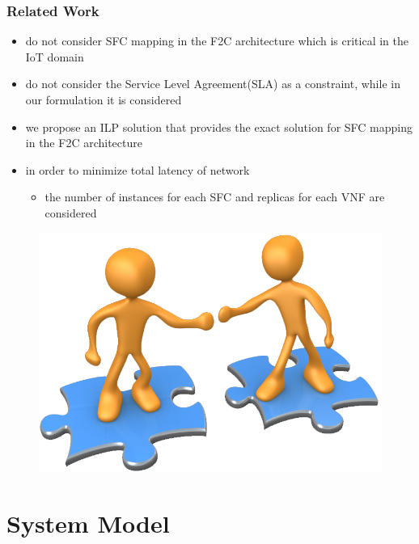 \documentclass{beamer}
\begin{document}
\begin{frame}
\frametitle{Related Work}
\begin{itemize}{}	
	\item{ do not
		consider SFC mapping in the F2C architecture which is critical in the IoT domain}
	\item{do not consider the Service Level Agreement(SLA) as a constraint, while in our formulation it is considered}
	\item{we propose an ILP solution that provides the
		exact solution for SFC mapping in the F2C architecture}
	\item{in order to minimize total latency of network}
	\begin{itemize}
		\item {the
			number of instances for each SFC and replicas for each VNF are
			considered}
	\end{itemize}
\end{itemize}
\begin{figure}
	\centering
	\includegraphics[width=0.3\linewidth]{related}
	\label{fig:related}
\end{figure}

\end{frame}
\section{System Model}
\end{document}
